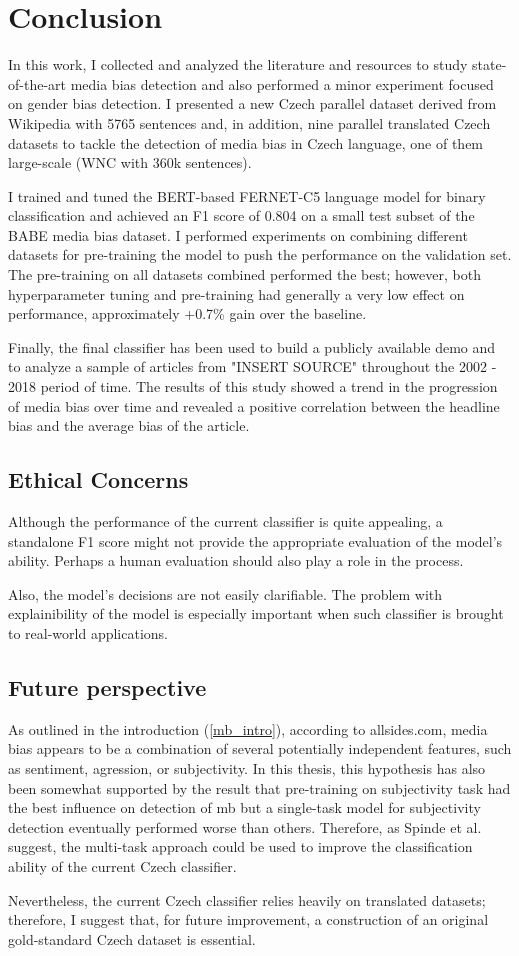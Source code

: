\chapter{Conclusion}
In this work, I collected and analyzed the literature and resources to study state-of-the-art media bias detection and also performed a minor experiment focused on gender bias detection. I presented a new Czech parallel dataset derived from Wikipedia with 5765 sentences and, in addition, nine parallel translated Czech datasets to tackle the detection of media bias in Czech language, one of them large-scale (WNC with 360k sentences).

I trained and tuned the BERT-based FERNET-C5 language model for binary classification and achieved an F1 score of 0.804 on a small test subset of the BABE media bias dataset. I performed experiments on combining different datasets for pre-training the model to push the performance on the validation set. The pre-training on all datasets combined performed the best; however, both hyperparameter tuning and pre-training had generally a very low effect on performance, approximately +0.7\% gain over the baseline. 

Finally, the final classifier has been used to build a publicly available demo and to analyze a sample of articles from "INSERT SOURCE" throughout the 2002 - 2018 period of time. The results of this study showed a trend in the progression of media bias over time and revealed a positive correlation between the headline bias and the average bias of the article.

\section{Ethical Concerns}
Although the performance of the current classifier is quite appealing, a standalone F1 score might not provide the appropriate evaluation of the model's ability. Perhaps a human evaluation should also play a role in the process.

Also, the model's decisions are not easily clarifiable. The problem with explainibility of the model is especially important when such classifier is brought to real-world applications. 


\section{Future perspective}
As outlined in the introduction (\ref{mb_intro}), according to allsides.com, media bias appears to be a combination of several potentially independent features, such as sentiment, agression, or subjectivity. In this thesis, this hypothesis has also been somewhat supported by the result that pre-training on subjectivity task had the best influence on detection of \gls{mb} but a single-task model for subjectivity detection eventually performed worse than others. Therefore, as Spinde et al. \cite{spindeexploiting} suggest, the multi-task approach could be used to improve the classification ability of the current Czech classifier.


Nevertheless, the current Czech classifier relies heavily on translated datasets; therefore, I suggest that, for future improvement, a construction of an original gold-standard Czech dataset is essential.
